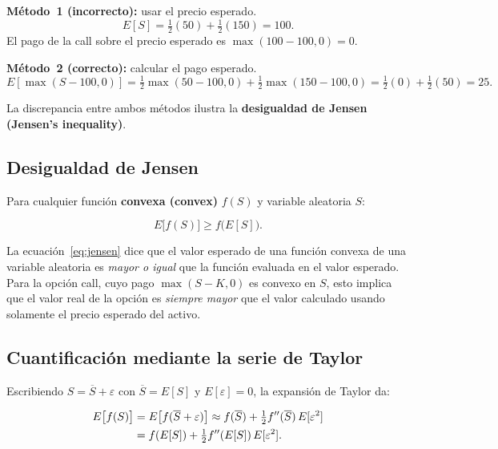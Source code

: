 \documentclass[12pt]{article}
\begin{document}
\medskip
\textbf{M\'etodo~1 (incorrecto):} usar el precio esperado.
\[
  E[S] = \tfrac{1}{2}(50) + \tfrac{1}{2}(150) = 100.
\]
El pago de la call sobre el precio esperado es $\max(100 - 100, 0) = 0$.

\medskip
\textbf{M\'etodo~2 (correcto):} calcular el pago esperado.
\[
  E[\max(S-100,0)] = \tfrac{1}{2}\max(50-100,0) + \tfrac{1}{2}\max(150-100,0)
                   = \tfrac{1}{2}(0) + \tfrac{1}{2}(50) = 25.
\]

La discrepancia entre ambos m\'etodos ilustra la \textbf{desigualdad de Jensen
(Jensen's inequality)}.

\subsection{Desigualdad de Jensen}

Para cualquier funci\'on \textbf{convexa (convex)} $f(S)$ y variable aleatoria $S$:

\begin{equation}
  E\bigl[f(S)\bigr] \geq f\bigl(E[S]\bigr).
  \label{eq:jensen}
\end{equation}

\begin{intuicionmat}
La ecuaci\'on~\eqref{eq:jensen} dice que el valor esperado de una funci\'on convexa
de una variable aleatoria es \emph{mayor o igual} que la funci\'on evaluada en el
valor esperado. Para la opci\'on call, cuyo pago $\max(S-K,0)$ es convexo en $S$,
esto implica que el valor real de la opci\'on es \emph{siempre mayor} que el valor
calculado usando solamente el precio esperado del activo.
\end{intuicionmat}

\subsection{Cuantificaci\'on mediante la serie de Taylor}

Escribiendo $S = \overline{S} + \varepsilon$ con $\overline{S} = E[S]$ y
$E[\varepsilon] = 0$, la expansi\'on de Taylor da:

\begin{align}
  E\bigl[f(S)\bigr] &= E\bigl[f(\overline{S} + \varepsilon)\bigr]
  \approx f(\overline{S}) + \tfrac{1}{2}f''(\overline{S})\,E[\varepsilon^2] \notag\\
  &= f(E[S]) + \tfrac{1}{2}f''(E[S])\,E[\varepsilon^2].
  \label{eq:taylor}
\end{align}
\end{document}
